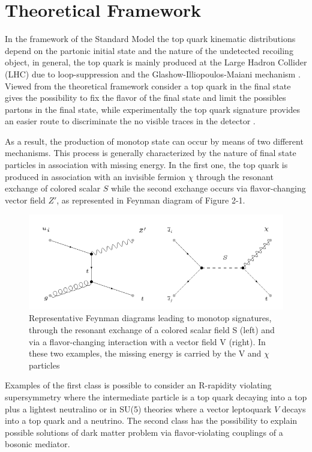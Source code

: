 \section{Theoretical Framework}
\label{sec:theory_framework}

In the framework of the Standard Model the top quark kinematic distributions depend on the partonic initial state and the nature of the undetected recoiling object, in general, the top quark is mainly produced at the Large Hadron Collider (LHC) due to loop-suppression and the Glashow-Illiopoulos-Maiani mechanism \cite{320}. Viewed from the theoretical framework consider a top quark in the final state gives the possibility to fix the flavor of the final state and limit the possibles partons in the final state, while experimentally the top quark signature provides an easier route to discriminate the no visible traces in the detector \cite{319}. 

As a result, the production of monotop state can occur by means of two different mechanisms. This process is generally characterized by the nature of final state particles in association with missing energy. In the first one, the top quark is produced in association with an invisible fermion $\chi$ through the resonant exchange of colored scalar $S$ while the second exchange occurs via flavor-changing vector field $Z'$, as represented in Feynman diagram of Figure 2-1.

\begin{figure}
\centering
\includegraphics[scale=0.60]{figures/Diagram.png}
\caption{Representative Feynman diagrams leading to monotop signatures, through the resonant exchange of a colored scalar field S (left) and via a flavor-changing interaction with a vector field V (right). In these two examples, the missing energy is carried by the V and $\chi$ particles}
\end{figure}

Examples of the first class is possible to consider an R-rapidity violating supersymmetry where the intermediate particle is a top quark decaying into a top plus a lightest neutralino or in SU(5) theories where a vector leptoquark $V$ decays into a top quark and a neutrino. The second class has the possibility to explain possible solutions of dark matter problem via flavor-violating couplings of a bosonic mediator.


